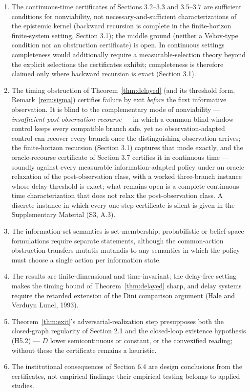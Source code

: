 \documentclass[10pt,twocolumn]{article}
\theoremstyle{definition}
\providecommand{\tightlist}{\setlength{\itemsep}{0pt}\setlength{\parskip}{0pt}}
\begin{document}
\begin{enumerate}
\def\labelenumi{(\roman{enumi})}
\tightlist
\item
  The continuous-time certificates of Sections 3.2--3.3 and 3.5--3.7 are sufficient conditions for nonviability, not necessary-and-sufficient characterizations of the epistemic kernel (backward recursion is complete in the finite-horizon finite-system setting, Section 3.1); the middle ground (neither a Veliov-type condition nor an obstruction certificate) is open. In
continuous settings completeness would additionally require a
measurable-selection theory beyond the explicit selections the
certificates exhibit; completeness is therefore claimed only where
backward recursion is exact (Section 3.1).
\item
  The timing obstruction of Theorem~\ref{thm:delayed} (and its threshold form, Remark~\ref{rem:sigma}) certifies failure by exit \emph{before} the first informative observation. It is blind to the complementary mode of nonviability --- \emph{insufficient post-observation recourse} --- in which a common blind-window control keeps every compatible branch safe, yet no observation-adapted control can recover every branch once the distinguishing observation arrives; the finite-horizon recursion (Section 3.1) captures that mode exactly, and the oracle-recourse certificate of Section 3.7 certifies it in continuous time --- soundly against every measurable information-adapted policy under an oracle relaxation of the post-observation class, with a worked three-branch instance whose delay threshold is exact; what remains open is a complete continuous-time characterization that does not relax the post-observation class. A discrete instance in which every one-step certificate is silent is given in the Supplementary Material (S3, A.3).
\item
  The information-set semantics is set-membership; probabilistic or belief-space formulations require separate statements, although the common-action obstruction transfers mutatis mutandis to any semantics in which the policy must choose a single action per information state.
\item
  The results are finite-dimensional and time-invariant; the delay-free setting makes the timing bound of Theorem~\ref{thm:delayed} sharp, and delay systems require the retarded extension of the Dini comparison argument (Hale and Verduyn Lunel, 1993).
\item
  Theorem~\ref{thm:exit}'s adversarial-realization step presupposes both the closed-graph regularity of Section 2.1 and the closed-loop existence hypothesis (H5.2) --- \(D\) lower semicontinuous or constant, or the convexified reading; without these the certificate remains a heuristic.
\item
  The institutional consequences of Section 6.4 are design conclusions from the certificates, not empirical findings; their empirical testing belongs to applied studies.
\end{enumerate}
\end{document}

